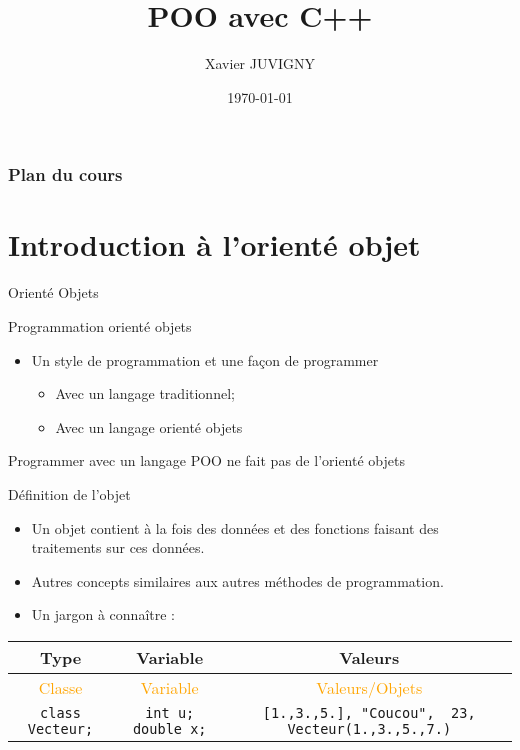 \documentclass[handout,10pt]{beamer}
\title[C++\hspace{2em}]{POO avec C++}
\author[Xavier JUVIGNY]{Xavier JUVIGNY}
\date{\today}
\institute{ONERA}
\begin{document}

\begin{frame}
 \titlepage
\end{frame}

\begin{frame}
\frametitle{Plan du cours}
\tableofcontents
\end{frame}

\section{Introduction à l'orienté objet}

\begin{frame}[fragile]{Orienté Objets}
\tiny
\begin{block}{Programmation orienté objets}
\begin{itemize}
\item Un style de programmation et une façon de programmer
\begin{itemize}
\item Avec un langage traditionnel;
\item Avec un langage orienté objets
\end{itemize}
\end{itemize}
\alert{Programmer avec un langage POO ne fait pas de l'orienté objets}
\end{block}

\begin{block}{Définition de l'objet}
\begin{itemize}
\item Un objet contient à la fois des données et des fonctions faisant des traitements sur ces données.
\item Autres concepts similaires aux autres méthodes de programmation.
\item Un jargon à connaître :
\end{itemize}
\begin{tabular}{|c|c|c|}\hline
Type & Variable & Valeurs \\ \hline
\textcolor{orange}{Classe} & \textcolor{orange}{Variable} & \textcolor{orange}{Valeurs/Objets} \\ \hline
\lstinline$class Vecteur;$ & \lstinline$int u; double x;$ & \lstinline$[1.,3.,5.], "Coucou",  23, Vecteur(1.,3.,5.,7.)$ \\ \hline
\end{tabular}
\end{block}
\end{frame}
\end{document}
